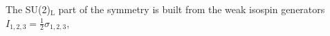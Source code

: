 The SU(2)$_{\text{L}}$ part of the symmetry is built from the weak
isospin generators \mbox{$I_{1,2,3} = \frac{1}{2}\sigma_{1,2,3}$},
